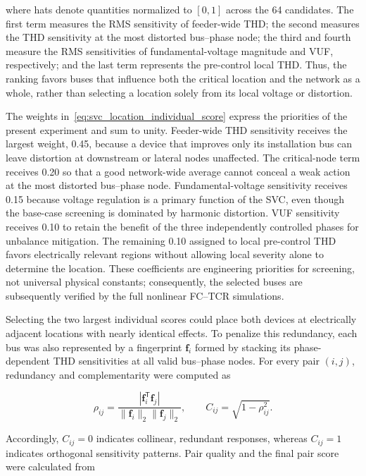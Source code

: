 \documentclass[journal]{IEEEtran}
\begin{document}
where hats denote quantities normalized to $[0,1]$ across the 64 candidates.
The first term measures the RMS sensitivity of feeder-wide THD; the second
measures the THD sensitivity at the most distorted bus--phase node; the third
and fourth measure the RMS sensitivities of fundamental-voltage magnitude and
VUF, respectively; and the last term represents the pre-control local THD.
Thus, the ranking favors buses that influence both the critical location and
the network as a whole, rather than selecting a location solely from its local
voltage or distortion.

The weights in~\eqref{eq:svc_location_individual_score} express the priorities
of the present experiment and sum to unity. Feeder-wide THD sensitivity
receives the largest weight, 0.45, because a device that improves only its
installation bus can leave distortion at downstream or lateral nodes
unaffected. The critical-node term receives 0.20 so that a good network-wide
average cannot conceal a weak action at the most distorted bus--phase node.
Fundamental-voltage sensitivity receives 0.15 because voltage regulation is a
primary function of the SVC, even though the base-case screening is dominated
by harmonic distortion. VUF sensitivity receives 0.10 to retain the benefit
of the three independently controlled phases for unbalance mitigation. The
remaining 0.10 assigned to local pre-control THD favors electrically relevant
regions without allowing local severity alone to determine the location.
These coefficients are engineering priorities for screening, not universal
physical constants; consequently, the selected buses are subsequently
verified by the full nonlinear FC--TCR simulations.

Selecting the two largest individual scores could place both devices at
electrically adjacent locations with nearly identical effects. To penalize
this redundancy, each bus was also represented by a fingerprint $\bm f_i$
formed by stacking its phase-dependent THD sensitivities at all valid
bus--phase nodes. For every pair $(i,j)$, redundancy and complementarity were
computed as

\begin{equation}
\rho_{ij}=\frac{|\bm f_i^{\mathsf T}\bm f_j|}
{\|\bm f_i\|_2\|\bm f_j\|_2},\qquad
C_{ij}=\sqrt{1-\rho_{ij}^{2}}.
\label{eq:svc_location_complementarity}
\end{equation}

Accordingly, $C_{ij}=0$ indicates collinear, redundant responses, whereas
$C_{ij}=1$ indicates orthogonal sensitivity patterns. Pair quality and the
final pair score were calculated from
\end{document}
